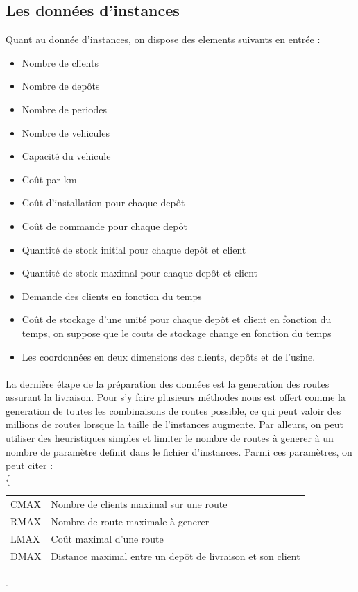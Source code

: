 \documentclass[a4paper,10pt]{article}
\begin{document}
\subsection{Les données d'instances}
Quant au donnée d'instances, on dispose des elements suivants en entrée :
\begin{itemize}
   \item Nombre de clients
   \item Nombre de depôts 
   \item Nombre de periodes 
   \item Nombre de vehicules
   \item Capacité du vehicule
   \item Coût par km
   \item Coût d'installation pour chaque depôt
   \item Coût de commande pour chaque depôt
   \item Quantité de stock initial pour chaque depôt et client
   \item Quantité de stock maximal pour chaque depôt et client
   \item Demande des clients en fonction du temps
   \item Coût de stockage d'une unité pour chaque depôt et client en fonction du temps,
	  on suppose que le couts de stockage change en fonction du temps
   \item Les coordonnées en deux dimensions des clients, depôts et de l'usine.
\end{itemize}

\paragraph{}
La dernière étape de la préparation des données est la generation des routes assurant la livraison. Pour s'y faire plusieurs méthodes nous est
offert comme la generation de toutes les combinaisons de routes possible, ce qui peut valoir des millions de routes lorsque la taille de l'instances
augmente. Par alleurs, on peut utiliser des heuristiques simples et limiter le nombre de routes à generer à un nombre de paramètre definit dans le 
fichier d'instances. Parmi ces paramètres, on peut citer :\\

\left\{
    \begin{tabular}{ll}
	CMAX & Nombre de clients maximal sur une route\\
	RMAX & Nombre de route maximale à generer\\
	LMAX & Coût maximal d'une route\\
	DMAX & Distance maximal entre un depôt de livraison et son client \\
    \end{tabular}
\right.
\end{document}

